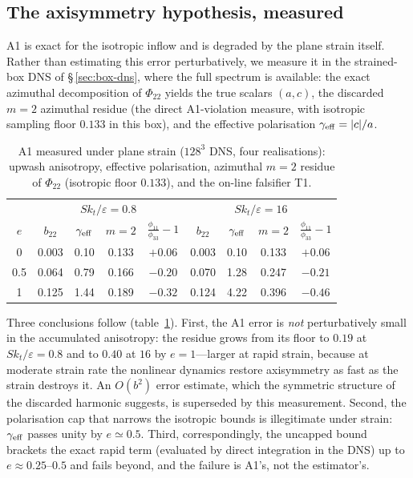\documentclass[lineno]{JFM-FLM_Au}
\begin{document}
\subsection{The axisymmetry hypothesis, measured}\label{sec:a1meas}

A1 is exact for the isotropic inflow and is degraded by the plane strain
itself. Rather than estimating this error perturbatively, we measure it in
the strained-box DNS of \S\,\ref{sec:box-dns}, where the full spectrum is
available: the exact azimuthal decomposition of $\Phi_{22}$ yields the true
scalars $(a,c)$, the discarded $m=2$ azimuthal residue (the direct
A1-violation measure, with isotropic sampling floor $0.133$ in this box),
and the effective polarisation $\gamma_{\rm eff}=|c|/a$.

\begin{table}
  \centering\small
  \begin{tabular}{c|cccc|cccc}
  & \multicolumn{4}{c|}{$Sk_t/\varepsilon=0.8$} & \multicolumn{4}{c}{$Sk_t/\varepsilon=16$}\\
  $e$ & $b_{22}$ & $\gamma_{\rm eff}$ & $m{=}2$ & $\tfrac{\phi_{11}}{\phi_{33}}{-}1$
      & $b_{22}$ & $\gamma_{\rm eff}$ & $m{=}2$ & $\tfrac{\phi_{11}}{\phi_{33}}{-}1$\\[1pt]
  0    & 0.003 & 0.10 & 0.133 & $+0.06$ & 0.003 & 0.10 & 0.133 & $+0.06$\\
  0.5  & 0.064 & 0.79 & 0.166 & $-0.20$ & 0.070 & 1.28 & 0.247 & $-0.21$\\
  1    & 0.125 & 1.44 & 0.189 & $-0.32$ & 0.124 & 4.22 & 0.396 & $-0.46$\\
  \end{tabular}
  \caption{A1 measured under plane strain ($128^3$ DNS, four realisations):
  upwash anisotropy, effective polarisation, azimuthal $m=2$ residue of
  $\Phi_{22}$ (isotropic floor $0.133$), and the on-line falsifier T1.}
  \label{tab:a1meas}
\end{table}

Three conclusions follow (table~\ref{tab:a1meas}). First, the A1 error is
\emph{not} perturbatively small in the accumulated anisotropy: the residue
grows from its floor to $0.19$ at $Sk_t/\varepsilon=0.8$ and to $0.40$ at
$16$ by $e=1$---larger at rapid strain, because at moderate strain rate the
nonlinear dynamics restore axisymmetry as fast as the strain destroys it.
An $O(b^2)$ error estimate, which the symmetric structure of the discarded
harmonic suggests, is superseded by this measurement. Second, the
polarisation cap that narrows the isotropic bounds is illegitimate under
strain: $\gamma_{\rm eff}$ passes unity by $e\simeq0.5$. Third,
correspondingly, the uncapped bound brackets the exact rapid term
(evaluated by direct integration in the DNS) up to $e\approx0.25$--$0.5$
and fails beyond, and the failure is A1's, not the estimator's.
\end{document}
